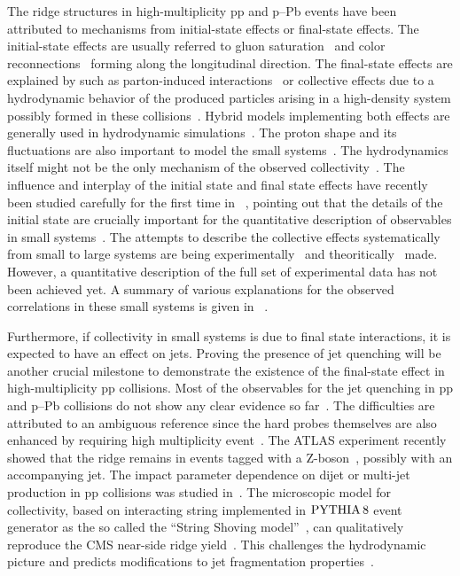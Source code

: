 The ridge structures in high-multiplicity pp and p--Pb events have been attributed to mechanisms from initial-state effects or final-state effects. The initial-state effects are usually referred to gluon saturation~\cite{Dusling:2012cg,Bzdak:2013zma} and color reconnections~\cite{Ortiz:2013yxa,Sarma:2019teo} forming along the longitudinal direction. The final-state effects are explained by such as parton-induced interactions~\cite{Arbuzov:2011yr} or collective effects due to a hydrodynamic behavior of the produced particles arising in a high-density system possibly formed in these collisions~\cite{Weller:2017tsr,Zhao:2017rgg}. 
Hybrid models implementing both effects are generally used in hydrodynamic simulations~\cite{Greif:2017bnr,Mantysaari:2017cni}. 
The proton shape and its fluctuations are also important to model the small systems~\cite{Mantysaari:2017cni}.
The hydrodynamics itself might not be the only mechanism of the observed collectivity~\cite{Zhao:2020pty}. 
The influence and interplay of the initial state and final state effects have recently been studied carefully for the first time in ~\cite{Greif:2019ygb}, pointing out that the details of the initial state are crucially important for the quantitative description of observables in small systems~\cite{Schenke:2019pmk}. 
The attempts to describe the collective effects systematically from small to large systems are being experimentally~\cite{Acharya:2019vdf} and theoritically~\cite{Greif:2019ygb} made.
However, a quantitative description of the full set of experimental data has not been achieved yet.
A summary of various explanations for the observed correlations in these small systems is given in ~\cite{Strickland:2018exs,Loizides:2016tew,Nagle:2018nvi}.

Furthermore, if collectivity in small systems is due to final state interactions, it is expected to have an effect on jets. Proving the presence of jet quenching will be another crucial milestone to demonstrate the existence of the final-state effect in high-multiplicity pp collisions. Most of the observables for the jet quenching in pp and p--Pb collisions do not show any clear evidence so far~\cite{Khachatryan:2016odn,Adam:2016jfp,Adam:2016dau,Acharya:2017okq}. The difficulties are attributed to an ambiguous reference since the hard probes themselves are also enhanced by requiring high multiplicity event~\cite{Adam:2016jfp,Acharya:2018egz}.
The ATLAS experiment recently showed that the ridge remains in events tagged with a Z-boson~\cite{Aaboud:2019mcw}, possibly with an accompanying jet.
The impact parameter dependence on dijet or multi-jet production in pp collisions was studied in~\cite{Frankfurt:2003td,Frankfurt:2010ea}.
The microscopic model for collectivity, based on interacting string implemented in $\mathrm{PYTHIA}\,8$ event generator as the so called the ``String Shoving model''~\cite{Bierlich:2017vhg}, can qualitatively reproduce the CMS near-side ridge yield~\cite{Khachatryan:2016txc}. This challenges the hydrodynamic picture and predicts modifications to jet fragmentation
properties~\cite{Bierlich:2019ixq}.

